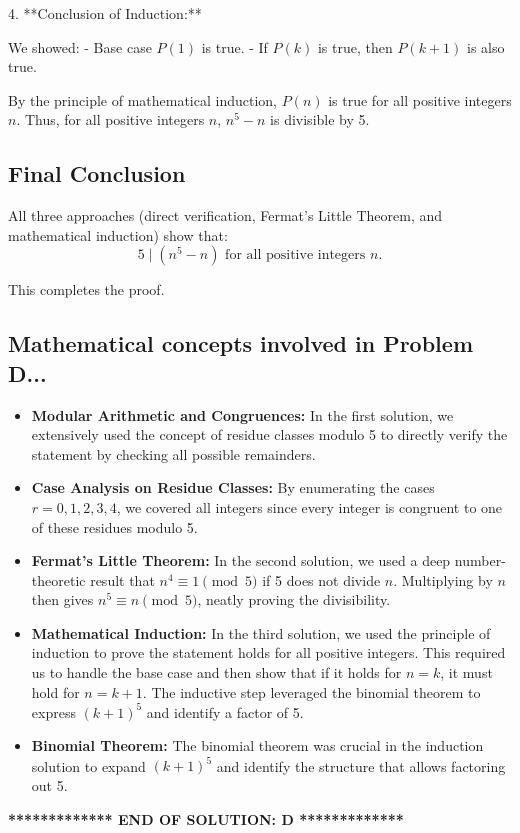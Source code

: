 \documentclass[12pt,a4paper]{article}
\begin{document}
\medskip

4. **Conclusion of Induction:**
\medskip
   
   We showed:
   - Base case $P(1)$ is true.
   - If $P(k)$ is true, then $P(k+1)$ is also true.

   By the principle of mathematical induction, $P(n)$ is true for all positive integers $n$. Thus, for all positive integers $n$, $n^5-n$ is divisible by 5.

\bigskip

\subsection*{Final Conclusion}

All three approaches (direct verification, Fermat’s Little Theorem, and mathematical induction) show that:
\[
\boxed{5 \mid (n^5 - n) \text{ for all positive integers } n.}
\]

This completes the proof.

\bigskip

\subsection*{Mathematical concepts involved in Problem D...}

\begin{itemize}
   \item \textbf{Modular Arithmetic and Congruences:}  
   In the first solution, we extensively used the concept of residue classes modulo 5 to directly verify the statement by checking all possible remainders.

   \item \textbf{Case Analysis on Residue Classes:}  
   By enumerating the cases $r=0,1,2,3,4$, we covered all integers since every integer is congruent to one of these residues modulo 5.

   \item \textbf{Fermat’s Little Theorem:}  
   In the second solution, we used a deep number-theoretic result that $n^4 \equiv 1 \pmod{5}$ if 5 does not divide $n$. Multiplying by $n$ then gives $n^5 \equiv n \pmod{5}$, neatly proving the divisibility.

   \item \textbf{Mathematical Induction:}  
   In the third solution, we used the principle of induction to prove the statement holds for all positive integers. This required us to handle the base case and then show that if it holds for $n=k$, it must hold for $n=k+1$. The inductive step leveraged the binomial theorem to express $(k+1)^5$ and identify a factor of 5.

   \item \textbf{Binomial Theorem:}  
   The binomial theorem was crucial in the induction solution to expand $(k+1)^5$ and identify the structure that allows factoring out 5.

\end{itemize}

\bigskip
\noindent\hrulefill
\begin{center}
\textbf{************* END OF SOLUTION: D *************}
\end{center}
\hrulefill
\end{document}
